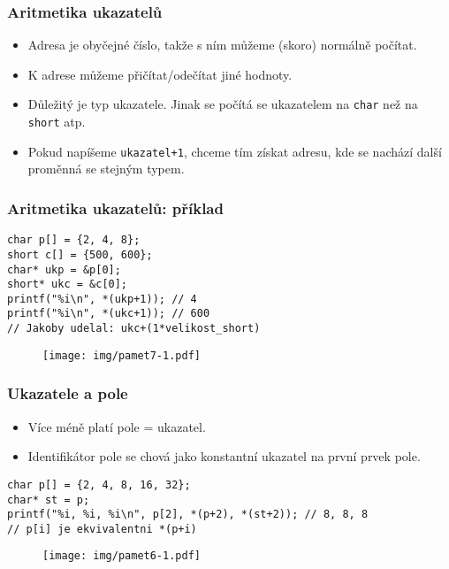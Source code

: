 \documentclass{beamer}
\newenvironment{itemizex}%
  {\large \begin{itemize}%
    \setlength{\itemsep}{8pt}%
    \setlength{\parskip}{8pt}}%
  {\end{itemize}}
\begin{document}




\begin{frame}[t,fragile]\frametitle{Aritmetika ukazatelů} 
    \begin{itemizex}
        \item Adresa je obyčejné číslo, takže s ním můžeme (skoro) normálně počítat.
        \item K adrese můžeme přičítat/odečítat jiné hodnoty.
        \item Důležitý je typ ukazatele. Jinak se počítá se ukazatelem na \texttt{char} než na \texttt{short} atp. 
        \item Pokud napíšeme \texttt{ukazatel+1}, chceme tím získat adresu, kde se nachází další proměnná se stejným typem.
    \end{itemizex}
\end{frame}



\begin{frame}[t,fragile]\frametitle{Aritmetika ukazatelů: příklad} 
\begin{verbatim} 
char p[] = {2, 4, 8};
short c[] = {500, 600};
char* ukp = &p[0];
short* ukc = &c[0];
printf("%i\n", *(ukp+1)); // 4
printf("%i\n", *(ukc+1)); // 600
// Jakoby udelal: ukc+(1*velikost_short)
\end{verbatim}

\begin{figure}[htb]
    \centering
    \texttt{[image: img/pamet7-1.pdf]}
\end{figure}
\end{frame}

\begin{frame}[t,fragile]\frametitle{Ukazatele a pole} 
    \begin{itemizex}
        \item Více méně platí pole = ukazatel.
        \item Identifikátor pole se chová jako konstantní ukazatel na první prvek pole.
    \end{itemizex}

\begin{verbatim} 
char p[] = {2, 4, 8, 16, 32};
char* st = p;
printf("%i, %i, %i\n", p[2], *(p+2), *(st+2)); // 8, 8, 8
// p[i] je ekvivalentni *(p+i)
\end{verbatim}
\begin{figure}[htb]
    \centering
    \texttt{[image: img/pamet6-1.pdf]}
\end{figure}
\end{frame}
\end{document}
